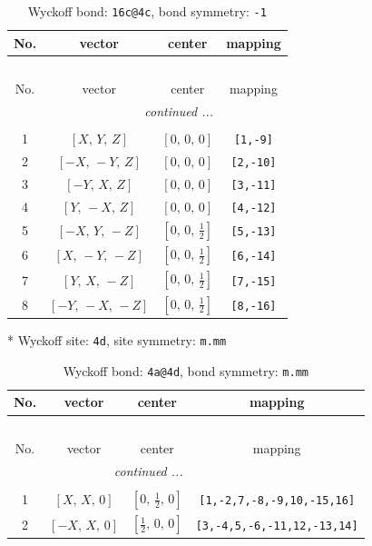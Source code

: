 \documentclass[fleqn,8pt]{jsarticle}
\begin{document}
\renewcommand{\arraystretch}{1.2}
\begin{longtable}{cccc}
\caption{Wyckoff bond: {\tt 16c@4c}, bond symmetry: {\tt -1}}
 \\
 \hline \hline
No. & vector & center & mapping \\ \hline \endfirsthead

\multicolumn{3}{l}{\tablename\ \thetable{}} \\
 \hline \hline
No. & vector & center & mapping \\ \hline \endhead

 \hline \hline
\multicolumn{3}{r}{\footnotesize\it continued ...} \\ \endfoot

 \hline \hline
\multicolumn{3}{r}{} \\ \endlastfoot

1 & $\left[ X,\, Y,\, Z \right]$ & $\left[ 0,\, 0,\, 0 \right]$ & {\tt [1,-9]} \\ \hline
2 & $\left[ - X,\, - Y,\, Z \right]$ & $\left[ 0,\, 0,\, 0 \right]$ & {\tt [2,-10]} \\ \hline
3 & $\left[ - Y,\, X,\, Z \right]$ & $\left[ 0,\, 0,\, 0 \right]$ & {\tt [3,-11]} \\ \hline
4 & $\left[ Y,\, - X,\, Z \right]$ & $\left[ 0,\, 0,\, 0 \right]$ & {\tt [4,-12]} \\ \hline
5 & $\left[ - X,\, Y,\, - Z \right]$ & $\left[ 0,\, 0,\, \frac{1}{2} \right]$ & {\tt [5,-13]} \\ \hline
6 & $\left[ X,\, - Y,\, - Z \right]$ & $\left[ 0,\, 0,\, \frac{1}{2} \right]$ & {\tt [6,-14]} \\ \hline
7 & $\left[ Y,\, X,\, - Z \right]$ & $\left[ 0,\, 0,\, \frac{1}{2} \right]$ & {\tt [7,-15]} \\ \hline
8 & $\left[ - Y,\, - X,\, - Z \right]$ & $\left[ 0,\, 0,\, \frac{1}{2} \right]$ & {\tt [8,-16]} \\
\end{longtable}
* Wyckoff site: {\tt 4d}, site symmetry: {\tt m.mm}
\renewcommand{\arraystretch}{1.2}
\begin{longtable}{cccc}
\caption{Wyckoff bond: {\tt 4a@4d}, bond symmetry: {\tt m.mm}}
 \\
 \hline \hline
No. & vector & center & mapping \\ \hline \endfirsthead

\multicolumn{3}{l}{\tablename\ \thetable{}} \\
 \hline \hline
No. & vector & center & mapping \\ \hline \endhead

 \hline \hline
\multicolumn{3}{r}{\footnotesize\it continued ...} \\ \endfoot

 \hline \hline
\multicolumn{3}{r}{} \\ \endlastfoot

1 & $\left[ X,\, X,\, 0 \right]$ & $\left[ 0,\, \frac{1}{2},\, 0 \right]$ & {\tt [1,-2,7,-8,-9,10,-15,16]} \\ \hline
2 & $\left[ - X,\, X,\, 0 \right]$ & $\left[ \frac{1}{2},\, 0,\, 0 \right]$ & {\tt [3,-4,5,-6,-11,12,-13,14]} \\
\end{longtable}
\end{document}
